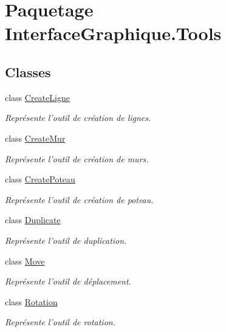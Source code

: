\hypertarget{namespace_interface_graphique_1_1_tools}{\section{Paquetage Interface\-Graphique.\-Tools}
\label{namespace_interface_graphique_1_1_tools}
}
\subsection*{Classes}
\begin{DoxyCompactItemize}
\item 
class \hyperlink{class_interface_graphique_1_1_tools_1_1_create_ligne}{Create\-Ligne}
\begin{DoxyCompactList}\small\item\em Représente l'outil de création de lignes. \end{DoxyCompactList}\item 
class \hyperlink{class_interface_graphique_1_1_tools_1_1_create_mur}{Create\-Mur}
\begin{DoxyCompactList}\small\item\em Représente l'outil de création de murs. \end{DoxyCompactList}\item 
class \hyperlink{class_interface_graphique_1_1_tools_1_1_create_poteau}{Create\-Poteau}
\begin{DoxyCompactList}\small\item\em Représente l'outil de création de poteau. \end{DoxyCompactList}\item 
class \hyperlink{class_interface_graphique_1_1_tools_1_1_duplicate}{Duplicate}
\begin{DoxyCompactList}\small\item\em Représente l'outil de duplication. \end{DoxyCompactList}\item 
class \hyperlink{class_interface_graphique_1_1_tools_1_1_move}{Move}
\begin{DoxyCompactList}\small\item\em Représente l'outil de déplacement. \end{DoxyCompactList}\item 
class \hyperlink{class_interface_graphique_1_1_tools_1_1_rotation}{Rotation}
\begin{DoxyCompactList}\small\item\em Représente l'outil de rotation. \end{DoxyCompactList}\item 

\end{DoxyCompactItemize}
